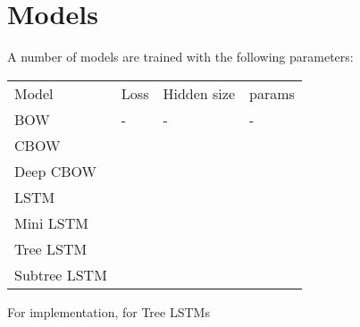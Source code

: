 \section{Models}
\label{sec: models}
A number of models are trained with the following parameters:

\begin{table}[]
\begin{tabular}{llll}
Model  & Loss & Hidden size & params \\
BOW          & -             & -           & -                \\
CBOW         &               &             &                  \\
Deep CBOW    &               &             &                  \\
LSTM         &               &             &                  \\
Mini LSTM    &               &             &                  \\
Tree LSTM    &               &             &                  \\
Subtree LSTM &               &             &                 
\end{tabular}
\end{table}

For implementation, for Tree LSTMs